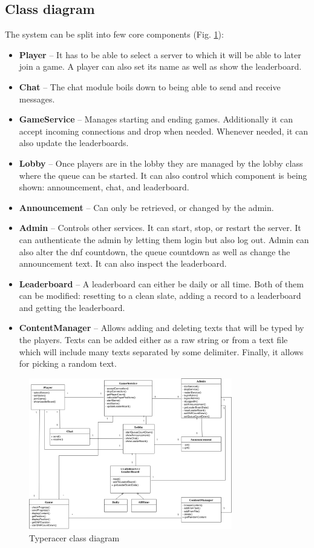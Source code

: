 \documentclass[titlepage]{article}
\newcommand{\figref}[1]{{(Fig. \hypersetup{linkcolor=blue}\ref{#1})}}
\begin{document}
\subsection{Class diagram}

The system can be split into few core components \figref{fig:class-diag}:

\begin{itemize}
	\item {\bf Player} -- It has to be able to select a server to which it will be able to later join a game. A player can also set its name as well as show the leaderboard.
	\item {\bf Chat} -- The chat module boils down to being able to send and receive messages.
	\item {\bf GameService} -- Manages starting and ending games. Additionally it can accept incoming connections and drop when needed. Whenever needed, it can also update the leaderboards.
	\item {\bf Lobby} -- Once players are in the lobby they are managed by the lobby class where the queue can be started. It can also control which component is being shown: announcement, chat, and leaderboard.
	\item {\bf Announcement} -- Can only be retrieved, or changed by the admin.
	\item {\bf Admin} -- Controls other services. It can start, stop, or restart the server. It can authenticate the admin by letting them login but also log out. Admin can also alter the dnf countdown, the queue countdown as well as change the announcement text. It can also inspect the leaderboard.
	\item {\bf Leaderboard} -- A leaderboard can either be daily or all time. Both of them can be modified: resetting to a clean slate, adding a record to a leaderboard and getting the leaderboard.
	\item {\bf ContentManager} -- Allows adding and deleting texts that will be typed by the players. Texts can be added either as a raw string or from a text file which will include many texts separated by some delimiter. Finally, it allows for picking a random text.
\end{itemize}

\begin{figure}[H]
	\centering
	\includegraphics[width=0.79\textwidth]{class_diagram.png}
	\caption{Typeracer class diagram}
	\label{fig:class-diag}
\end{figure}
\end{document}
